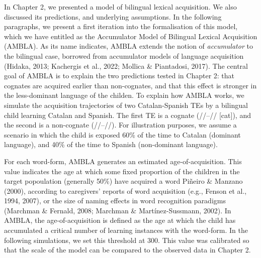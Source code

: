 \documentclass[
  12pt,
  b5paperpaper,
  twoside]{scrreprt}
\begin{document}
In Chapter 2, we presented a model of bilingual lexical acquisition. We
also discussed its predictions, and underlying assumptions. In the
following paragraphs, we present a first iteration into the
formalisation of this model, which we have entitled as the Accumulator
Model of Bilingual Lexical Acquisition (AMBLA). As its name indicates,
AMBLA extends the notion of \emph{accumulator} to the bilingual case,
borrowed from accumulator models of language acquisition (Hidaka, 2013;
Kachergis et al., 2022; Mollica \& Piantadosi, 2017). The central goal
of AMBLA is to explain the two predictions tested in Chapter 2: that
cognates are acquired earlier than non-cognates, and that this effect is
stronger in the less-dominant language of the childen. To explain how
AMBLA works, we simulate the acquisition trajectories of two
Catalan-Spanish TEs by a bilingual child learning Catalan and Spanish.
The first TE is a cognate (//--//
{[}cat{]}), and the second is a non-cognate
(//--//). For illustration purposes, we
assume a scenario in which the child is exposed 60\% of the time to
Catalan (dominant language), and 40\% of the time to Spanish
(non-dominant language).

For each word-form, AMBLA generates an estimated age-of-acquisition.
This value indicates the age at which some fixed proportion of the
children in the target popoulation (generally 50\%) have acquired a word
Piñeiro \& Manzano (2000), according to caregivers' reports of word
acquisition (e.g., Fenson et al., 1994, 2007), or the size of naming
effects in word recognition paradigms (Marchman \& Fernald, 2008;
Marchman \& Martínez-Sussmann, 2002). In AMBLA, the age-of-acquisition
is defined as the age at which the child has accumulated a critical
number of learning instances with the word-form. In the following
simulations, we set this threshold at 300. This value was calibrated so
that the scale of the model can be compared to the observed data in
Chapter 2.
\end{document}
